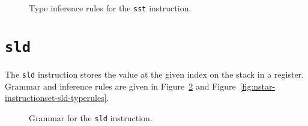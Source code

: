 \begin{figure}[H]
  \centering



  \caption{Type inference rules for the \texttt{sst} instruction.}
  \label{fig:nstar-instructionset-sst-typerules}
\end{figure}

\section{\texttt{sld}}\label{sec:nstar-instructionset-sld}

The \texttt{sld} instruction stores the value at the given index on the stack in a register.
Grammar and inference rules are given in Figure~\ref{fig:nstar-instructionset-sld-grammar} and Figure~\ref{fig:nstar-instructionset-sld-typerules}.

\begin{figure}[H]
  \centering


  \caption{Grammar for the \texttt{sld} instruction.}
  \label{fig:nstar-instructionset-sld-grammar}
\end{figure}

